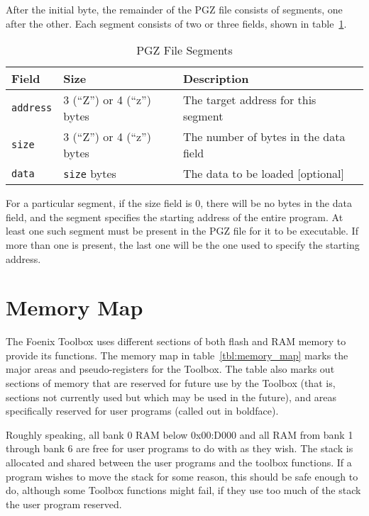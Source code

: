 After the initial byte, the remainder of the PGZ file consists of segments, one after the other. Each segment consists of two or three fields,
shown in table~\ref{tbl:pgz_file_segments}.

\begin{table}
	\begin{center}
		\begin{tabular}{|l|l|l|} \hline
			Field &	Size & Description \\ \hline\hline
			\verb+address+ & 3 (“Z”) or 4 (“z”) bytes & The target address for this segment \\ \hline
			\verb+size+ & 3 (“Z”) or 4 (“z”) bytes & The number of bytes in the data field \\ \hline
			\verb+data+ & \verb+size+ bytes & The data to be loaded [optional] \\ \hline
		\end{tabular}
	\end{center}
	\caption{PGZ File Segments}
	\label{tbl:pgz_file_segments}
\end{table}

For a particular segment, if the size field is 0, there will be no bytes in the data field,
and the segment specifies the starting address of the entire program.
At least one such segment must be present in the PGZ file for it to be executable.
If more than one is present, the last one will be the one used to specify the starting address.

\section{Memory Map}
The Foenix Toolbox uses different sections of both flash and RAM memory to provide its functions.
The memory map in table~\ref{tbl:memory_map} marks the major areas and pseudo-registers for the Toolbox.
The table also marks out sections of memory that are reserved for future use by the Toolbox (that is,
sections not currently used but which may be used in the future), and areas specifically reserved for user
programs (called out in boldface).

Roughly speaking, all bank 0 RAM below 0x00:D000 and all RAM from bank 1 through bank 6 are free for user programs
to do with as they wish. The stack is allocated and shared between the user programs and the toolbox functions.
If a program wishes to move the stack for some reason, this should be safe enough to do, although some Toolbox functions
might fail, if they use too much of the stack the user program reserved.

